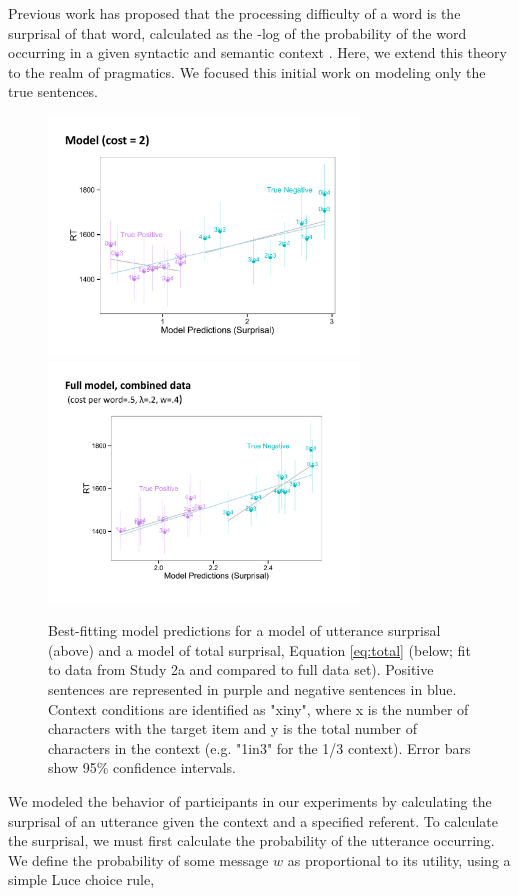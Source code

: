 \documentclass[10pt,letterpaper]{article}
\begin{document}
Previous work has proposed that the processing difficulty of a word is the surprisal of that word, calculated as the -log of the probability of the word occurring in a given syntactic and semantic context \cite{levy2008}.  Here, we extend this theory to the realm of pragmatics.  We focused this initial work on modeling only the true sentences.  

\begin{figure}
\begin{center} 
\includegraphics[width=3.25in]{figures/model1_comparison.pdf}
\includegraphics[width=3.25in]{figures/model2_comparison.pdf}
\caption{\label{fig:model1_sims} Best-fitting model predictions for a model of utterance surprisal (above) and a model of total surprisal, Equation \ref{eq:total} (below; fit to data from Study 2a and compared to full data set).  Positive sentences are represented in purple and negative sentences in blue.  Context conditions are identified as "xiny", where x is the number of characters with the target item and y is the total number of characters in the context (e.g. "1in3" for the 1/3 context).  Error bars show 95\% confidence intervals.}
\end{center} 
\end{figure}

We modeled the behavior of participants in our experiments by calculating the surprisal of an utterance given the context and a specified referent.  To calculate the surprisal, we must first calculate the probability of the utterance occurring.  We define the probability of some message $w$ as proportional to its utility, using a simple Luce choice rule, 
\end{document}
